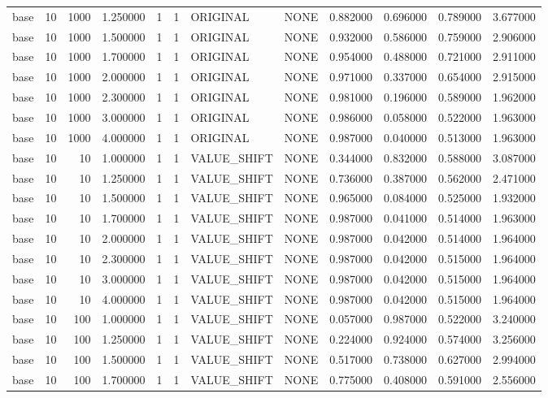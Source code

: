 \begin{tabular}{lrrrllllrrrr}
base & 10 & 1000 & 1.250000 & 1 & 1 & ORIGINAL & NONE & 0.882000 & 0.696000 & 0.789000 & 3.677000 \\
base & 10 & 1000 & 1.500000 & 1 & 1 & ORIGINAL & NONE & 0.932000 & 0.586000 & 0.759000 & 2.906000 \\
base & 10 & 1000 & 1.700000 & 1 & 1 & ORIGINAL & NONE & 0.954000 & 0.488000 & 0.721000 & 2.911000 \\
base & 10 & 1000 & 2.000000 & 1 & 1 & ORIGINAL & NONE & 0.971000 & 0.337000 & 0.654000 & 2.915000 \\
base & 10 & 1000 & 2.300000 & 1 & 1 & ORIGINAL & NONE & 0.981000 & 0.196000 & 0.589000 & 1.962000 \\
base & 10 & 1000 & 3.000000 & 1 & 1 & ORIGINAL & NONE & 0.986000 & 0.058000 & 0.522000 & 1.963000 \\
base & 10 & 1000 & 4.000000 & 1 & 1 & ORIGINAL & NONE & 0.987000 & 0.040000 & 0.513000 & 1.963000 \\
base & 10 & 10 & 1.000000 & 1 & 1 & VALUE_SHIFT & NONE & 0.344000 & 0.832000 & 0.588000 & 3.087000 \\
base & 10 & 10 & 1.250000 & 1 & 1 & VALUE_SHIFT & NONE & 0.736000 & 0.387000 & 0.562000 & 2.471000 \\
base & 10 & 10 & 1.500000 & 1 & 1 & VALUE_SHIFT & NONE & 0.965000 & 0.084000 & 0.525000 & 1.932000 \\
base & 10 & 10 & 1.700000 & 1 & 1 & VALUE_SHIFT & NONE & 0.987000 & 0.041000 & 0.514000 & 1.963000 \\
base & 10 & 10 & 2.000000 & 1 & 1 & VALUE_SHIFT & NONE & 0.987000 & 0.042000 & 0.514000 & 1.964000 \\
base & 10 & 10 & 2.300000 & 1 & 1 & VALUE_SHIFT & NONE & 0.987000 & 0.042000 & 0.515000 & 1.964000 \\
base & 10 & 10 & 3.000000 & 1 & 1 & VALUE_SHIFT & NONE & 0.987000 & 0.042000 & 0.515000 & 1.964000 \\
base & 10 & 10 & 4.000000 & 1 & 1 & VALUE_SHIFT & NONE & 0.987000 & 0.042000 & 0.515000 & 1.964000 \\
base & 10 & 100 & 1.000000 & 1 & 1 & VALUE_SHIFT & NONE & 0.057000 & 0.987000 & 0.522000 & 3.240000 \\
base & 10 & 100 & 1.250000 & 1 & 1 & VALUE_SHIFT & NONE & 0.224000 & 0.924000 & 0.574000 & 3.256000 \\
base & 10 & 100 & 1.500000 & 1 & 1 & VALUE_SHIFT & NONE & 0.517000 & 0.738000 & 0.627000 & 2.994000 \\
base & 10 & 100 & 1.700000 & 1 & 1 & VALUE_SHIFT & NONE & 0.775000 & 0.408000 & 0.591000 & 2.556000 \\

\end{tabular}
